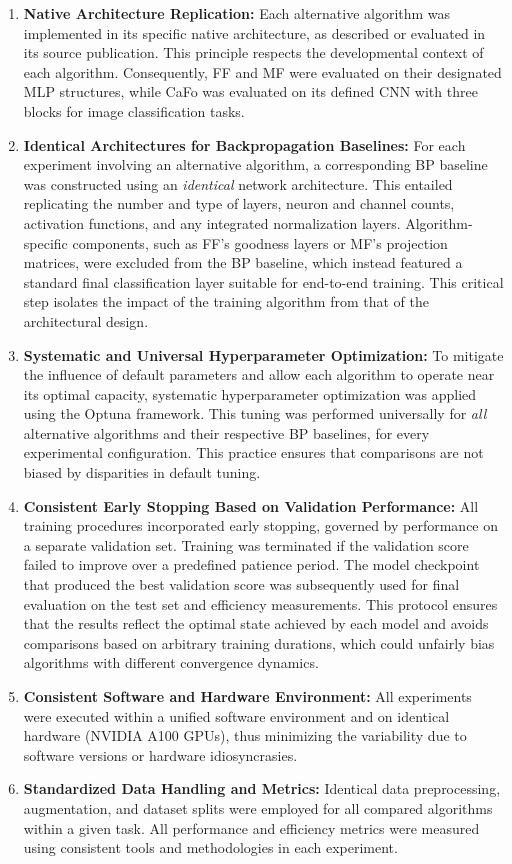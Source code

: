 \begin{enumerate}
    \item \textbf{Native Architecture Replication:} Each alternative algorithm was implemented in its specific native architecture, as described or evaluated in its source publication. This principle respects the developmental context of each algorithm. Consequently, FF and MF were evaluated on their designated MLP structures, while CaFo was evaluated on its defined CNN with three blocks for image classification tasks.

    \item \textbf{Identical Architectures for Backpropagation Baselines:} For each experiment involving an alternative algorithm, a corresponding BP baseline was constructed using an \emph{identical} network architecture. This entailed replicating the number and type of layers, neuron and channel counts, activation functions, and any integrated normalization layers. Algorithm-specific components, such as FF's goodness layers or MF's projection matrices, were excluded from the BP baseline, which instead featured a standard final classification layer suitable for end-to-end training. This critical step isolates the impact of the training algorithm from that of the architectural design.

    \item \textbf{Systematic and Universal Hyperparameter Optimization:} To mitigate the influence of default parameters and allow each algorithm to operate near its optimal capacity, systematic hyperparameter optimization was applied using the Optuna framework. This tuning was performed universally for \emph{all} alternative algorithms and their respective BP baselines, for every experimental configuration. This practice ensures that comparisons are not biased by disparities in default tuning.

    \item \textbf{Consistent Early Stopping Based on Validation Performance:} All training procedures incorporated early stopping, governed by performance on a separate validation set. Training was terminated if the validation score failed to improve over a predefined patience period. The model checkpoint that produced the best validation score was subsequently used for final evaluation on the test set and efficiency measurements. This protocol ensures that the results reflect the optimal state achieved by each model and avoids comparisons based on arbitrary training durations, which could unfairly bias algorithms with different convergence dynamics.

    \item \textbf{Consistent Software and Hardware Environment:} All experiments were executed within a unified software environment and on identical hardware (NVIDIA A100 GPUs), thus minimizing the variability due to software versions or hardware idiosyncrasies.

    \item \textbf{Standardized Data Handling and Metrics:} Identical data preprocessing, augmentation, and dataset splits were employed for all compared algorithms within a given task. All performance and efficiency metrics were measured using consistent tools and methodologies in each experiment.
\end{enumerate}
